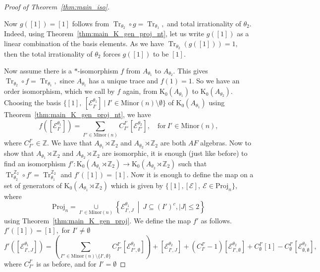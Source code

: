 \documentclass[9pt, BCOR=2mm]{amsart}
\numberwithin{equation}{section}
\numberwithin{equation}{section}
\newcommand{\Z}{{\mathbb{Z}}}
\newcommand{\K}{\mathrm{K}} %
\newcommand{\suchthat}{\middle |}
\DeclareMathOperator{\Tr}{Tr}
\begin{document}
\begin{proof}[Proof of Theorem~\ref{thm:main_iso}]
	\begin{center}
	\end{center}
Now $g([1])=[1]$ follows from $\Tr_{\theta_{2}} \circ g=\Tr_{\theta_{1}},$ and total irrationality of $\theta_2.$ Indeed, using Theorem~\ref{thm:main_K_gen_proj_nt}, let us write $g([1])$ as a linear combination of the basis elements. As we have $\Tr_{\theta_{2}}( g([1]))=1,$ then the total irrationality of $\theta_{2}$ forces $g([1])$ to be $[1].$

Now assume there is a $*$-isomorphism $f$ from $A_{\theta_{1}}$ to $A_{\theta_{2}}.$ This gives $\Tr_{\theta_{2}} \circ f=\Tr_{\theta_{1}},$ since $A_{\theta_{1}}$ has a unique trace and $f(1)=1.$ So we have an order isomorphism, which we call by  $f$ again, from $\K_0(A_{\theta_{1}})$ to $\K_0(A_{\theta_{2}}).$ Choosing the basis $\{[1],~[\mathcal{E}^{\theta_1}_{I'}]~|~I' \in \mathrm{Minor}(n)\setminus\emptyset\}$  of $\K_0(A_{\theta_1})$ using Theorem~\ref{thm:main_K_gen_proj_nt}, we have 
$$f([\mathcal{E}^{\theta_1}_{I'}])= \sum_{I''\in \mathrm{Minor}(n)} C^{I'}_{I''}[\mathcal{E}^{\theta_2}_{I''}], \quad \text{for}~ I'\in \mathrm{Minor}(n),$$ where $C^{I'}_{I''}\in \Z.$
We have that $A_{\theta_{1}}\rtimes \Z_2$ and $A_{\theta_{2}}\rtimes \Z_2$ are both $AF$ algebras. Now to show that $A_{\theta_{1}}\rtimes \Z_2$ and $A_{\theta_{2}}\rtimes \Z_2$ are isomorphic, it is enough (just like before) to find an isomorphism $f': \K_{0}\left(A_{\theta_{1}}\rtimes \Z_2\right) \rightarrow \K_{0}\left(A_{\theta_{2}}\rtimes \Z_2\right)$ such that $\Tr^{\Z_2
}_{\theta_{2}} \circ f'=\Tr^{\Z_2
}_{\theta_{1}}$ and $f'([1])=[1].$ Now it is enough to define the map  on a set of generators of $\K_0(A_{\theta_{1}}\rtimes \Z_2)$ which is given by $\{[1], [\mathcal{E}],~ \mathcal{E} \in \mathrm{Proj}_n\},$ where 
$$ \mathrm{Proj}_n= \underset{I'\in \mathrm{Minor}(n)}{\cup}\left\{\mathcal{E}_{I',J}^{\theta_1}~\suchthat ~J\subseteq (I')^c,|J|\le 2 \right\}$$ using Theorem~\ref{thm:main_K_gen_proj}.
We define the map $f'$ as follows. $f'([1])=[1],$ 
for $I'\neq \emptyset$
 $$f'([\mathcal{E}_{I',J}^{\theta_1}]) = \left(\sum_{I''\in \mathrm{Minor}(n)\setminus \{I',\emptyset\}} C^{I'}_{I''}[\mathcal{E}^{\theta_2}_{I'',\emptyset}]\right)+[\mathcal{E}^{\theta_2}_{I',J}]+(C^{I'}_{I'}-1)[\mathcal{E}^{\theta_2}_{I',\emptyset}]+C^{I'}_{\emptyset}[1]-C^{I'}_{\emptyset}[\mathcal{E}^{\theta_2}_{\emptyset,\emptyset}],$$  where $C^{I'}_{I''}$ is as before, and for $I'= \emptyset$


\end{proof}
\end{document}
